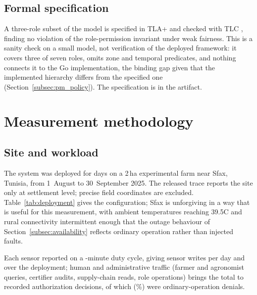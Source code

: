 \documentclass[a4paper,fleqn]{cas-sc}
\begin{document}
\subsection{Formal specification}
\label{subsec:tla}

A three-role subset of the model is specified in TLA+ and checked with TLC
\cite{lamport2002specifying,newcombe2015amazon}, finding no violation of
the role-permission invariant under weak fairness. This is a sanity check
on a small model, not verification of the deployed framework: it covers
three of seven roles, omits zone and temporal predicates, and nothing
connects it to the Go implementation, the binding gap given that the
implemented hierarchy differs from the specified one
(Section~\ref{subsec:pm_policy}). The specification is in the artifact.

\FloatBarrier
\section{Measurement methodology}
\label{sec:method}

\subsection{Site and workload}
\label{subsec:deployment}

The system was deployed for \DeployDays{} days on a 2\,ha experimental
farm near Sfax, Tunisia, from 1~August to 30~September 2025. The released
trace reports the site only at settlement level; precise field coordinates
are excluded. Table~\ref{tab:deployment} gives the configuration; Sfax is
unforgiving in a way that is useful for this measurement, with ambient
temperatures reaching 39.5\textdegree{}C and rural connectivity
intermittent enough that the outage behaviour of
Section~\ref{subsec:availability} reflects ordinary operation rather than
injected faults.

Each sensor reported on a \DutyCycleMinutes-minute duty cycle, giving
\WritesPerDay{} sensor writes per day and \SensorWrites{} over the
deployment; human and administrative traffic (farmer and agronomist
queries, certifier audits, supply-chain reads, role operations) brings the
total to \TotalDecisions{} recorded authorization decisions, of which
\TotalDenied{} (\DenyRatePct\%) were ordinary-operation denials.
\end{document}
